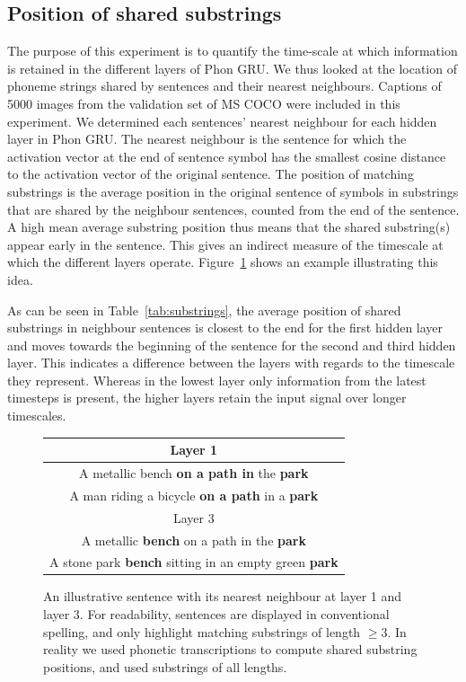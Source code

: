 \subsection{Position of shared substrings}
The purpose of this experiment is to quantify the time-scale at which information is retained in the different layers of {\sc Phon GRU}. We thus looked at the location of phoneme strings shared by sentences and their nearest neighbours. Captions of 5000 images from the validation set of MS COCO were included in this experiment. We determined each sentences' nearest neighbour for each hidden layer in {\sc Phon GRU}. The nearest neighbour is the sentence for which the activation vector at the end of sentence symbol has the smallest cosine distance to the activation vector of the original sentence. The position of matching substrings is the average position in the original sentence of symbols in substrings that are shared by the neighbour sentences, counted from the end of the sentence. A high mean average substring position thus means that the shared substring(s) appear early in the sentence. This gives an indirect measure of the timescale at which the different layers operate. Figure~\ref{fig:example-shared} shows an example illustrating this idea. 

As can be seen in Table~\ref{tab:substrings}, the average position of shared substrings in neighbour sentences is closest to the end for the first hidden layer and moves towards the beginning of the sentence for the second and third hidden layer. This indicates a difference between the layers with regards to the timescale they represent. Whereas in the lowest layer only information from the latest timesteps is present, the higher layers retain the input  signal over longer timescales.


\begin{figure}[h]
  \begin{tabular}{c}
    Layer 1 \\\hline
    A metallic bench {\bf on a path in} the {\bf park} \\
    A man riding a bicycle {\bf on a path} in a {\bf park} \\\hline
    Layer 3 \\\hline
    A metallic {\bf bench} on a path in the {\bf park} \\
    A stone park {\bf bench} sitting in an empty green {\bf park}\\ \hline
  \end{tabular}
  \caption{An illustrative sentence with its nearest neighbour at layer 1 and layer 3. For readability, sentences are displayed in conventional spelling, and only highlight matching substrings of length $\geq3$. In reality we used phonetic transcriptions to compute shared substring positions, and used substrings of all lengths. }
\label{fig:example-shared}
\end{figure}


